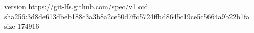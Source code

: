 version https://git-lfs.github.com/spec/v1
oid sha256:3d8de613dbeb188c3a3b8a2ce50d7ffc5724ffbd8645c19ce5c5664a9b22b1fa
size 174916
